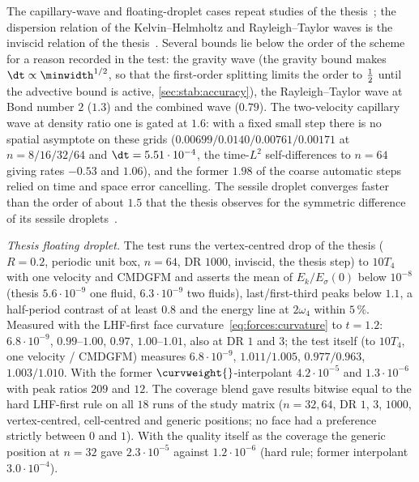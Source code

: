 The capillary-wave and floating-droplet cases repeat studies of the
thesis~; the dispersion relation of the
Kelvin--Helmholtz and Rayleigh--Taylor waves is the inviscid relation of the
thesis~. Several bounds lie below the order of the scheme
for a reason recorded in the test: the gravity wave (the gravity bound makes
$\dt\propto\minwidth^{1/2}$, so that the first-order splitting limits the
order to $\frac{1}{2}$ until the advective bound is active,
\cref{sec:stab:accuracy}), the
Rayleigh--Taylor wave at Bond number $2$ ($1.3$) and the combined wave
($0.79$). The two-velocity capillary wave at density ratio one is gated at
$1.6$: with a fixed small step there is no spatial asymptote on these grids
($0.00699/0.0140/0.00761/0.00171$ at $n=8/16/32/64$ and
$\dt=5.51\cdot10^{-4}$, the time-$L^2$ self-differences to $n=64$ giving rates
$-0.53$ and $1.06$), and the former $1.98$ of the coarse automatic steps relied
on time and space error cancelling. The
sessile droplet converges faster than the order of about $1.5$ that the
thesis observes for the symmetric difference of its sessile
droplets~.

\emph{Thesis floating droplet.}\label{par:verif:floating-drop} The test
runs the vertex-centred drop of the thesis ($R=0.2$, periodic unit box,
$n=64$, DR $1000$, inviscid, the thesis step) to $10T_4$ with one velocity and
CMDGFM and asserts the mean of $E_k/E_\sigma(0)$ below $10^{-8}$ (thesis
$5.6\cdot10^{-9}$ one fluid, $6.3\cdot10^{-9}$ two fluids), last/first-third
peaks below $1.1$, a half-period contrast of at least $0.8$ and the energy
line at $2\omega_4$ within $5\,\%$. Measured with the LHF-first face
curvature~\cref{eq:forces:curvature} to $t=1.2$: $6.8\cdot10^{-9}$,
$0.99$--$1.00$, $0.97$, $1.00$--$1.01$, also at DR $1$ and $3$; the test
itself (to $10T_4$, one velocity / CMDGFM) measures $6.8\cdot10^{-9}$,
$1.011/1.005$, $0.977/0.963$, $1.003/1.010$. With the former
$\curvweight{}$-interpolant $4.2\cdot10^{-5}$ and $1.3\cdot10^{-6}$ with
peak ratios $209$ and $12$. The coverage blend gave results bitwise equal to the
hard LHF-first rule on all $18$ runs of the study matrix ($n=32,64$, DR $1$,
$3$, $1000$, vertex-centred, cell-centred and generic positions; no face had a
preference strictly between $0$ and $1$). With the quality itself as the
coverage the generic position at $n=32$ gave $2.3\cdot10^{-5}$ against
$1.2\cdot10^{-6}$ (hard rule; former interpolant $3.0\cdot10^{-4}$).

